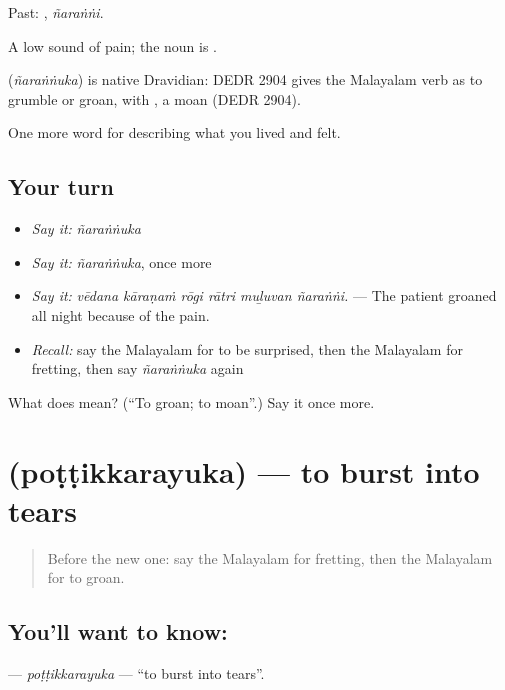 Past: , \emph{ñaraṅṅi}.

A low sound of pain; the noun is .

\begin{cousinweb}
\textbf{} (\emph{ñaraṅṅuka}) is native Dravidian: DEDR 2904 gives the Malayalam verb as to grumble or groan, with , a moan (DEDR 2904).
\end{cousinweb}

\begin{grammarlens}[title={What you've built}]
One more word for describing what you lived and felt.
\end{grammarlens}

\subsection*{Your turn}
\begin{itemize}
\raggedright
  \item \emph{Say it:} \emph{ñaraṅṅuka}
  \item \emph{Say it:} \emph{ñaraṅṅuka}, once more
  \item \emph{Say it:} \emph{vēdana kāraṇaṁ rōgi rātri muḻuvan ñaraṅṅi.} — The patient groaned all night because of the pain.
  \item \emph{Recall:} say the Malayalam for to be surprised, then the Malayalam for fretting, then say \emph{ñaraṅṅuka} again
\end{itemize}

\begin{tcolorbox}[breakable,colback=teal!4,colframe=teal!35!black,title={Before you move on}]
What does  mean? (\textquotedblleft{}To groan; to moan\textquotedblright{}.) Say it once more.
\end{tcolorbox}
\section[\texorpdfstring{\ml{പൊട്ടിക്കരയുക} (poṭṭikkarayuka)}{പൊട്ടിക്കരയുക (poṭṭikkarayuka)}]{ (poṭṭikkarayuka) — to burst into tears}

\label{lesson:ML-C525-pottikkarayuka}



\begin{quote}
Before the new one: say the Malayalam for fretting, then the Malayalam for to groan.
\end{quote}

\subsection*{You'll want to know: }
\textbf{} — \emph{poṭṭikkarayuka} — \textquotedblleft{}to burst into tears\textquotedblright{}.


